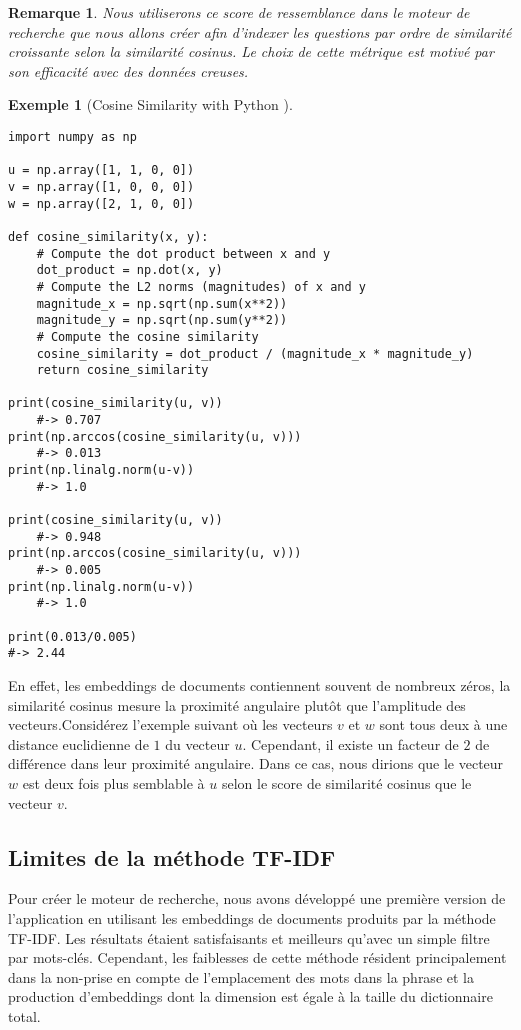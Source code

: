 \documentclass[12pt]{article}
\newtheorem{rmq}{Remarque}
\theoremstyle{definition}
\newtheorem{ex}{Exemple}
\begin{document}
\begin{rmq}
	Nous utiliserons ce score de ressemblance dans le moteur de recherche que nous allons créer afin d'indexer les questions par ordre de similarité croissante selon la similarité cosinus. Le choix de cette métrique est motivé par son efficacité avec des données creuses.
\end{rmq}
\newpage 
\begin{ex}[Cosine Similarity with Python \cite{CosineSimilarity}]\hfill\\
	
\begin{lstlisting}
import numpy as np

u = np.array([1, 1, 0, 0])
v = np.array([1, 0, 0, 0])
w = np.array([2, 1, 0, 0])

def cosine_similarity(x, y):
	# Compute the dot product between x and y
	dot_product = np.dot(x, y)
	# Compute the L2 norms (magnitudes) of x and y
	magnitude_x = np.sqrt(np.sum(x**2)) 
	magnitude_y = np.sqrt(np.sum(y**2))
	# Compute the cosine similarity
	cosine_similarity = dot_product / (magnitude_x * magnitude_y)
	return cosine_similarity

print(cosine_similarity(u, v))
	#-> 0.707
print(np.arccos(cosine_similarity(u, v)))
	#-> 0.013
print(np.linalg.norm(u-v))
	#-> 1.0

print(cosine_similarity(u, v))
	#-> 0.948
print(np.arccos(cosine_similarity(u, v)))
	#-> 0.005
print(np.linalg.norm(u-v))
	#-> 1.0

print(0.013/0.005)
#-> 2.44
\end{lstlisting}

	En effet, les embeddings de documents contiennent souvent de nombreux zéros, la similarité cosinus mesure la proximité angulaire plutôt que l'amplitude des vecteurs.Considérez l'exemple suivant où les vecteurs $v$ et $w$ sont tous deux à une distance euclidienne de $1$ du vecteur $u$. Cependant, il existe un facteur de $2$ de différence dans leur proximité angulaire. Dans ce cas, nous dirions que le vecteur $w$ est deux fois plus semblable à $u$ selon le score de similarité cosinus que le vecteur $v$.
\end{ex}




\subsection{Limites de la méthode TF-IDF}
 Pour créer le moteur de recherche, nous avons développé une première version de l'application en utilisant les embeddings de documents produits par la méthode TF-IDF. Les résultats étaient satisfaisants et meilleurs qu'avec un simple filtre par mots-clés. Cependant, les faiblesses de cette méthode résident principalement dans la non-prise en compte de l'emplacement des mots dans la phrase et la production d'embeddings dont la dimension est égale à la taille du dictionnaire total. 
\end{document}
